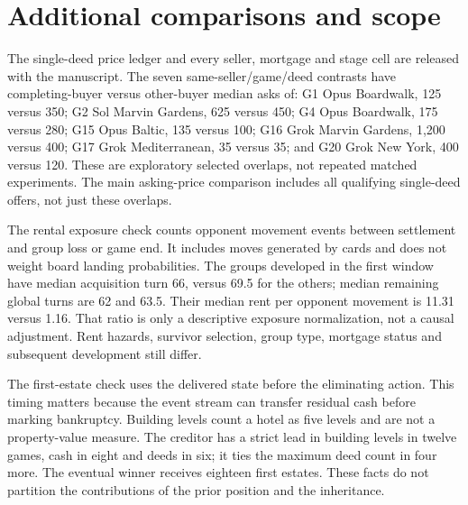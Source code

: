 \section{Additional comparisons and scope}
\label{app:comparisons}



The single-deed price ledger and every seller, mortgage and stage cell are released with the manuscript. The seven same-seller/game/deed contrasts have completing-buyer versus other-buyer median asks of: G1 Opus Boardwalk, 125 versus 350; G2 Sol Marvin Gardens, 625 versus 450; G4 Opus Boardwalk, 175 versus 280; G15 Opus Baltic, 135 versus 100; G16 Grok Marvin Gardens, 1,200 versus 400; G17 Grok Mediterranean, 35 versus 35; and G20 Grok New York, 400 versus 120. These are exploratory selected overlaps, not repeated matched experiments. The main asking-price comparison includes all qualifying single-deed offers, not just these overlaps.

The rental exposure check counts opponent movement events between settlement and group loss or game end. It includes moves generated by cards and does not weight board landing probabilities. The groups developed in the first window have median acquisition turn 66, versus 69.5 for the others; median remaining global turns are 62 and 63.5. Their median rent per opponent movement is 11.31 versus 1.16. That ratio is only a descriptive exposure normalization, not a causal adjustment. Rent hazards, survivor selection, group type, mortgage status and subsequent development still differ.

The first-estate check uses the delivered state before the eliminating action. This timing matters because the event stream can transfer residual cash before marking bankruptcy. Building levels count a hotel as five levels and are not a property-value measure. The creditor has a strict lead in building levels in twelve games, cash in eight and deeds in six; it ties the maximum deed count in four more. The eventual winner receives eighteen first estates. These facts do not partition the contributions of the prior position and the inheritance.

